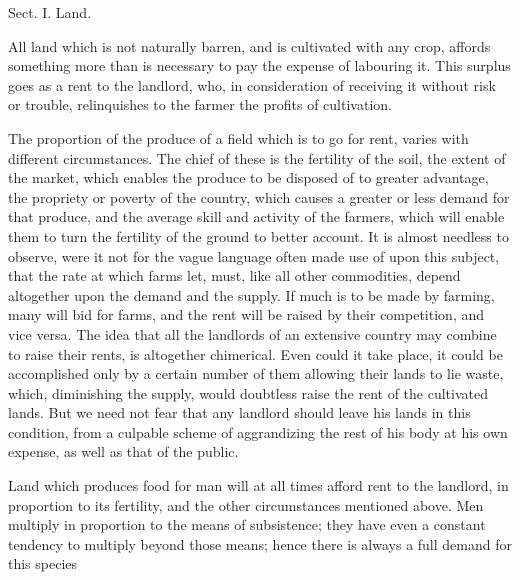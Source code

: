 \documentclass{article}
\begin{document}
Sect. I. Land.

All land which is not naturally barren, and is cultivated with any crop, affords something more than is necessary to pay the expense of labouring it. This surplus goes as a rent to the landlord, who, in consideration of receiving it without risk or trouble, relinquishes to the farmer the profits of cultivation.

The proportion of the produce of a field which is to go for rent, varies with different circumstances. The chief of these is the fertility of the soil, the extent of the market, which enables the produce to be disposed of to greater advantage, the propriety or poverty of the country, which causes a greater or less demand for that produce, and the average skill and activity of the farmers, which will enable them to turn the fertility of the ground to better account. It is almost needless to observe, were it not for the vague language often made use of upon this subject, that the rate at which farms let, must, like all other commodities, depend altogether upon the demand and the supply. If much is to be made by farming, many will bid for farms, and the rent will be raised by their competition, and vice versa. The idea that all the landlords of an extensive country may combine to raise their rents, is altogether chimerical. Even could it take place, it could be accomplished only by a certain number of them allowing their lands to lie waste, which, diminishing the supply, would doubtless raise the rent of the cultivated lands. But we need not fear that any landlord should leave his lands in this condition, from a culpable scheme of aggrandizing the rest of his body at his own expense, as well as that of the public.

Land which produces food for man will at all times afford rent to the landlord, in proportion to its fertility, and the other circumstances mentioned above. Men multiply in proportion to the means of subsistence; they have even a constant tendency to multiply beyond those means; hence there is always a full demand for this species
\end{document}
